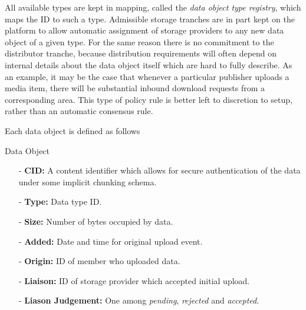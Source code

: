 \documentclass{article}
\newenvironment{concept_box}[1]
    {
    \begin{tcolorbox}
    {\large \textbf{#1} }
    }
    {
    \end{tcolorbox}
    }
\begin{document}
All available types are kept in mapping, called the \textit{data object type registry}, which maps the ID to such a type. Admissible storage tranches are in part kept on the platform to allow automatic assignment of storage providers to any new data object of a given type. For the same reason there is no commitment to the distributor tranche, because distribution requirements will often depend on internal details about the data object itself which are hard to fully describe. As an example, it may be the case that whenever a particular publisher uploads a media item, there will be substantial inbound download requests from a corresponding area. This type of policy rule is better left to discretion to setup, rather than an automatic consensus rule.

Each data object is defined as follows\\

\begin{concept_box}{Data Object}
\begin{itemize}

  \item[-] \textbf{CID:} A content identifier which allows for secure authentication of the data under some implicit chunking schema.

  \item[-] \textbf{Type:} Data type ID.


  \item[-] \textbf{Size:} Number of bytes occupied by data.

  \item[-] \textbf{Added:} Date and time for original upload event.

  \item[-] \textbf{Origin:} ID of member who uploaded data.

  \item[-] \textbf{Liaison:} ID of storage provider which accepted initial upload.

  \item[-] \textbf{Liason Judgement:} One among \textit{pending}, \textit{rejected} and \textit{accepted}.

\end{itemize}

\end{concept_box}
\end{document}
